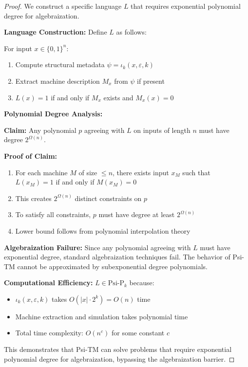 \documentclass[11pt]{article}
\begin{document}
\begin{proof}
We construct a specific language $L$ that requires exponential polynomial degree for algebraization.

\textbf{Language Construction:}
Define $L$ as follows:

For input $x \in \{0,1\}^n$:
\begin{enumerate}
\item Compute structural metadata $\psi = \iota_k(x, \varepsilon, k)$
\item Extract machine description $M_x$ from $\psi$ if present
\item $L(x) = 1$ if and only if $M_x$ exists and $M_x(x) = 0$
\end{enumerate}

\textbf{Polynomial Degree Analysis:}

\textbf{Claim:} Any polynomial $p$ agreeing with $L$ on inputs of length $n$ must have degree $2^{\Omega(n)}$.

\textbf{Proof of Claim:}
\begin{enumerate}
\item For each machine $M$ of size $\leq n$, there exists input $x_M$ such that $L(x_M) = 1$ if and only if $M(x_M) = 0$
\item This creates $2^{\Omega(n)}$ distinct constraints on $p$
\item To satisfy all constraints, $p$ must have degree at least $2^{\Omega(n)}$
\item Lower bound follows from polynomial interpolation theory
\end{enumerate}

\textbf{Algebraization Failure:}
Since any polynomial agreeing with $L$ must have exponential degree, standard algebraization techniques fail. The behavior of Psi-TM cannot be approximated by subexponential degree polynomials.

\textbf{Computational Efficiency:}
$L \in \text{Psi-P}_k$ because:
\begin{itemize}
\item $\iota_k(x, \varepsilon, k)$ takes $O(|x| \cdot 2^k) = O(n)$ time
\item Machine extraction and simulation takes polynomial time
\item Total time complexity: $O(n^c)$ for some constant $c$
\end{itemize}

This demonstrates that Psi-TM can solve problems that require exponential polynomial degree for algebraization, bypassing the algebraization barrier.
\end{proof}
\end{document}
